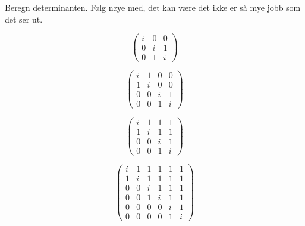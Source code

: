 \begin{oppgave}
Beregn determinanten. Følg nøye med,  det kan være det ikke er så mye jobb som det ser ut.
\begin{punkt}
\[
\begin{pmatrix}
 i & 0 & 0 \\  0 & i & 1 \\  0& 1  &i  
\end{pmatrix}
\]
\end{punkt}
\begin{punkt}
\[
\begin{pmatrix}
i & 1 & 0 & 0 \\ 1 & i & 0 & 0 \\ 0 & 0 & i & 1 \\ 0 & 0& 1  &i  
\end{pmatrix}
\]
\end{punkt}

\begin{punkt}
\[
\begin{pmatrix}
i & 1 & 1 & 1  \\ 1 & i & 1 & 1 \\ 0 & 0 & i & 1 \\ 0 & 0& 1  &i 
\end{pmatrix}
\]
\end{punkt}

\begin{punkt}
\[
\begin{pmatrix}
i & 1 & 1 & 1 & 1 & 1 \\ 1 & i & 1 & 1 & 1 & 1\\ 0 & 0 & i & 1& 1 & 1 \\ 0 & 0& 1  &i & 1 & 1 \\ 0 & 0 & 0 & 0 & i & 1\\ 0 & 0 & 0 & 0 & 1 & i 
\end{pmatrix}
\]
\end{punkt}


\end{oppgave}

